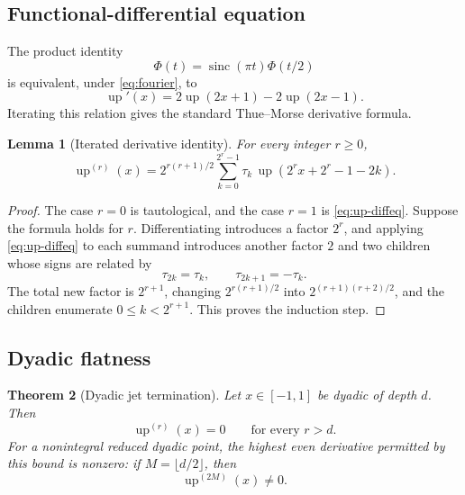 \documentclass[11pt]{article}
\newtheorem{theorem}{Theorem}[section]
\newtheorem{lemma}[theorem]{Lemma}
\newcommand{\upf}{\operatorname{up}}
\newcommand{\sinc}{\operatorname{sinc}}
\begin{document}
\subsection{Functional-differential equation}

The product identity
\[
 \Phi(t)=\sinc(\pi t)\Phi(t/2)
\]
is equivalent, under \cref{eq:fourier}, to
\begin{equation}\label{eq:up-diffeq}
 \upf'(x)=2\upf(2x+1)-2\upf(2x-1).
\end{equation}
Iterating this relation gives the standard Thue--Morse derivative formula.

\begin{lemma}[Iterated derivative identity]\label{lem:derivative-formula}
For every integer \(r\ge0\),
\begin{equation}\label{eq:derivative-formula}
 \boxed{\displaystyle
 \upf^{(r)}(x)=2^{r(r+1)/2}
 \sum_{k=0}^{2^r-1}\tau_k\,
 \upf\!\left(2^r x+2^r-1-2k\right).}
\end{equation}
\end{lemma}

\begin{proof}
The case \(r=0\) is tautological, and the case \(r=1\) is
\cref{eq:up-diffeq}.  Suppose the formula holds for \(r\).  Differentiating
introduces a factor \(2^r\), and applying \cref{eq:up-diffeq} to each summand
introduces another factor \(2\) and two children whose signs are related by
\[
 \tau_{2k}=\tau_k,
 \qquad
 \tau_{2k+1}=-\tau_k.
\]
The total new factor is \(2^{r+1}\), changing
\(2^{r(r+1)/2}\) into \(2^{(r+1)(r+2)/2}\), and the children enumerate
\(0\le k<2^{r+1}\).  This proves the induction step.
\end{proof}

\subsection{Dyadic flatness}

\begin{theorem}[Dyadic jet termination]\label{thm:dyadic-flatness}
Let \(x\in[-1,1]\) be dyadic of depth \(d\).  Then
\begin{equation}\label{eq:dyadic-vanishing}
 \upf^{(r)}(x)=0\qquad\text{for every }r>d.
\end{equation}
For a nonintegral reduced dyadic point, the highest even derivative permitted by
this bound is nonzero: if \(M=\lfloor d/2\rfloor\), then
\begin{equation}\label{eq:top-even-nonzero}
 \upf^{(2M)}(x)\ne0.
\end{equation}
\end{theorem}
\end{document}
